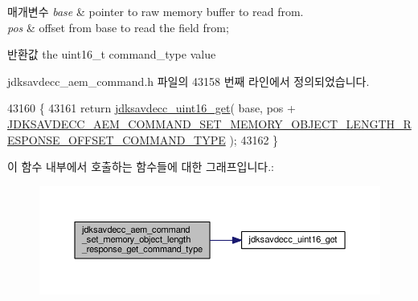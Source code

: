 \begin{DoxyParams}{매개변수}
{\em base} & pointer to raw memory buffer to read from. \\
\hline
{\em pos} & offset from base to read the field from; \\
\hline
\end{DoxyParams}
\begin{DoxyReturn}{반환값}
the uint16\+\_\+t command\+\_\+type value 
\end{DoxyReturn}


jdksavdecc\+\_\+aem\+\_\+command.\+h 파일의 43158 번째 라인에서 정의되었습니다.


\begin{DoxyCode}
43160 \{
43161     \textcolor{keywordflow}{return} \hyperlink{group__endian_ga3fbbbc20be954aa61e039872965b0dc9}{jdksavdecc\_uint16\_get}( base, pos + 
      \hyperlink{group__command__set__memory__object__length__response_ga24612c2a9ac9332e20fb6e80746e9a34}{JDKSAVDECC\_AEM\_COMMAND\_SET\_MEMORY\_OBJECT\_LENGTH\_RESPONSE\_OFFSET\_COMMAND\_TYPE}
       );
43162 \}
\end{DoxyCode}


이 함수 내부에서 호출하는 함수들에 대한 그래프입니다.\+:
\nopagebreak
\begin{figure}[H]
\begin{center}
\leavevmode
\includegraphics[width=350pt]{group__command__set__memory__object__length__response_ga3b47eee1f7df23712dc12be6a9874643_cgraph}
\end{center}
\end{figure}


